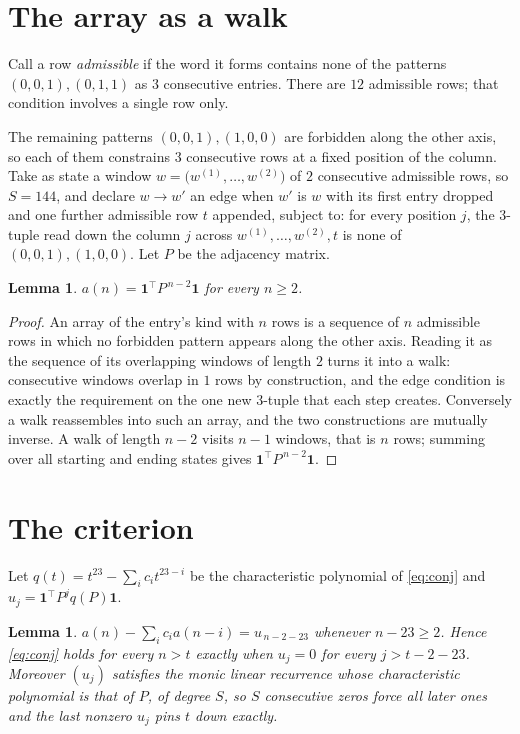 \documentclass[11pt,a4paper]{article}
\theoremstyle{plain}
\newtheorem{lemma}[theorem]{Lemma}
\theoremstyle{definition}
\begin{document}
\section{The array as a walk}

Call a row \emph{admissible} if the word it forms contains none of the patterns
$(0,0,1), (0,1,1)$ as $3$ consecutive entries. There are $12$ admissible rows; that condition
involves a single row only.

The remaining patterns $(0,0,1), (1,0,0)$ are forbidden along the other axis, so each of them
constrains $3$ consecutive rows at a fixed position of the column. Take as state a
window $w=\bigl(w^{(1)},\dots,w^{(2)}\bigr)$ of $2$ consecutive admissible
rows, so $S=144$, and declare $w\to w'$ an edge when $w'$ is $w$ with its first entry
dropped and one further admissible row $t$ appended, subject to: for every position
$j$, the $3$-tuple read down the column $j$ across $w^{(1)},\dots,w^{(2)},t$
is none of $(0,0,1), (1,0,0)$. Let $P$ be the adjacency matrix.

\begin{lemma}\label{lem:walk}
$a(n)=\mathbf{1}^{\!\top}P^{\,n-2}\mathbf{1}$ for every $n\ge2$.
\end{lemma}

\begin{proof}
An array of the entry's kind with $n$ rows is a sequence of $n$ admissible rows in
which no forbidden pattern appears along the other axis. Reading it as the sequence of its
overlapping windows of length $2$ turns it into a walk: consecutive windows overlap in
$1$ rows by construction, and the edge condition is exactly the requirement on the one
new $3$-tuple that each step creates. Conversely a walk reassembles into such an array,
and the two constructions are mutually inverse. A walk of length $n-2$ visits $n-1$
windows, that is $n$ rows; summing over all starting and ending states gives
$\mathbf{1}^{\!\top}P^{\,n-2}\mathbf{1}$.
\end{proof}

\section{The criterion}

Let $q(t)=t^{23}-\sum_i c_i t^{23-i}$ be the characteristic polynomial of
\eqref{eq:conj} and $u_j=\mathbf{1}^{\!\top}P^{j}q(P)\mathbf{1}$.

\begin{lemma}\label{lem:crit}
$a(n)-\sum_i c_i a(n-i)=u_{\,n-2-23}$ whenever $n-23\ge2$. Hence
\eqref{eq:conj} holds for every $n>t$ exactly when $u_j=0$ for every
$j>t-2-23$. Moreover $(u_j)$ satisfies the monic linear recurrence whose
characteristic polynomial is that of $P$, of degree $S$, so $S$ consecutive zeros force all
later ones and the last nonzero $u_j$ pins $t$ down exactly.
\end{lemma}
\end{document}
